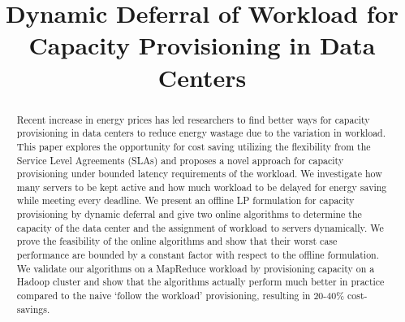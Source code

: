 \documentclass[10pt,conference,compsocconf,letterpaper]{IEEEtran}
\begin{document}
\title{Dynamic Deferral of Workload for Capacity Provisioning in Data Centers}


\author{
}















\maketitle


\begin{abstract}
Recent increase in energy prices has led researchers to find better ways for capacity provisioning in data centers to reduce energy wastage due to the variation in workload. This paper explores the opportunity for cost saving utilizing the flexibility from the Service Level Agreements (SLAs) and proposes a novel approach for capacity provisioning under bounded latency requirements of the workload. We investigate how many servers to be kept active and how much workload to be delayed for energy saving while meeting every deadline. We present an offline LP formulation for capacity provisioning by dynamic deferral and give two online algorithms to determine the capacity of the data center and the assignment of workload to servers dynamically. We prove the feasibility of the online algorithms and show that their worst case performance are bounded by a constant factor with respect to the offline formulation. We validate our algorithms on a MapReduce workload by provisioning capacity on a Hadoop cluster and show that the algorithms actually perform much better in practice compared to the naive `follow the workload' provisioning, resulting in 20-40\% cost-savings.
\end{abstract}
\end{document}
